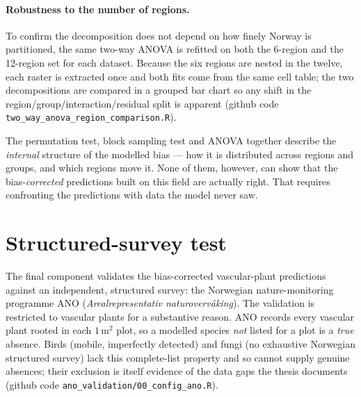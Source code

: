 \paragraph{Robustness to the number of regions.}
To confirm the decomposition does not depend on how finely Norway is
partitioned, the same two-way ANOVA is refitted on both the 6-region and the
12-region set for each dataset. Because the six regions are nested in the
twelve, each raster is extracted once and both fits come from the same cell
table; the two decompositions are compared in a grouped bar chart so any
shift in the region/group/interaction/residual split is apparent (github
code \texttt{two\_way\_anova\_region\_comparison.R}).

The permutation test, block sampling test and ANOVA together describe the
\emph{internal} structure of the modelled bias --- how it is distributed
across regions and groups, and which regions move it. None of them, however,
can show that the bias-\emph{corrected} predictions built on this field are
actually right. That requires confronting the predictions with data the
model never saw.

\section{Structured-survey test}
\label{sec:ano}

The final component validates the bias-corrected vascular-plant predictions
against an independent, structured survey: the Norwegian nature-monitoring
programme ANO (\emph{Arealrepresentativ naturovervåking}). The validation is
restricted to vascular plants for a substantive reason. ANO records every
vascular plant rooted in each $1\,\text{m}^2$ plot, so a modelled species
\emph{not} listed for a plot is a \emph{true} absence. Birds (mobile,
imperfectly detected) and fungi (no exhaustive Norwegian structured survey)
lack this complete-list property and so cannot supply genuine absences;
their exclusion is itself evidence of the data gaps the thesis documents
(github code \texttt{ano\_validation/00\_config\_ano.R}).

